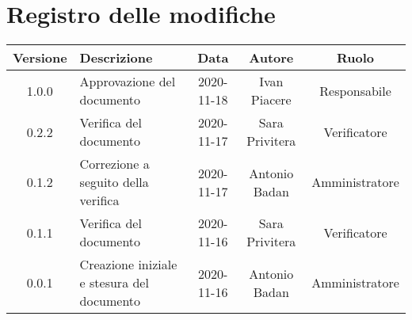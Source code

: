 \section*{Registro delle modifiche}

\begin{center}
	\begin{longtable}{|c|p{5cm}|c|c|c|}
	\hline
	\rowcolor{lighter-grayer}
	\textbf{Versione} & \textbf{Descrizione} & \textbf{Data} & \textbf{Autore} & \textbf{Ruolo} \\
	\hline
	\endfirsthead


	1.0.0 & Approvazione del documento & 2020-11-18 & Ivan Piacere & Responsabile \\
	\hline
	0.2.2 & Verifica del documento & 2020-11-17 & Sara Privitera & Verificatore \\
	\hline
	0.1.2 & Correzione a seguito della verifica & 2020-11-17 & Antonio Badan & Amministratore \\
	\hline
	0.1.1 & Verifica del documento & 2020-11-16 & Sara Privitera & Verificatore \\
	\hline
	0.0.1 & Creazione iniziale e stesura del documento & 2020-11-16 & Antonio Badan & Amministratore \\
	\hline
	\end{longtable}
\end{center}

